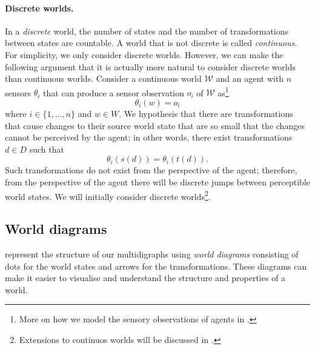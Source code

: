 \paragraph{Discrete worlds.}
In a \emph{discrete} world, the number of states and the number of transformations between states are countable.
A world that is not discrete is called \emph{continuous}.
For simplicity, we only consider discrete worlds.
However, we can make the following argument that it is actually more natural to consider discrete worlds than continuous worlds.
Consider a continuous world $\mathscr{W}$ and an agent with $n$ sensors $\theta_{i}$ that can produce a sensor observation $o_{i}$ of $\mathscr{W}$ as\footnote{
More on how we model the sensory observations of agents in .
}
\begin{equation}
	\theta_{i}(w) = o_{i}
\end{equation}
where $i \in \{1, ..., n\}$ and $w \in W$.
We hypothesis that there are transformations that cause changes to their source world state that are so small that the changes cannot be perceived by the agent; in other words, there exist transformations $d \in D$ such that
\begin{equation}
	\theta_{i}(s(d)) = \theta_{i}(t(d)).
\end{equation}
Such transformations do not exist from the perspective of the agent; therefore, from the perspective of the agent there will be discrete jumps between perceptible world states.
We will initially consider discrete worlds\footnote{Extensions to continuos worlds will be discussed in .
}.


\subsection{World diagrams}

 represent the structure of our multidigraphs using \emph{world diagrams} consisting of dots for the world states and arrows for the transformations.
These diagrams can make it easier to visualise and understand the structure and properties of a world.

